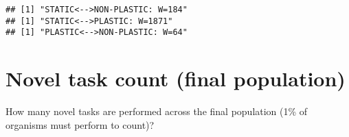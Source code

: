 \documentclass[]{book}
\newenvironment{Shaded}{\begin{snugshade}}{\end{snugshade}}
\newcommand{\ControlFlowTok}[1]{\textcolor[rgb]{0.13,0.29,0.53}{\textbf{#1}}}
\newcommand{\DataTypeTok}[1]{\textcolor[rgb]{0.13,0.29,0.53}{#1}}
\newcommand{\DecValTok}[1]{\textcolor[rgb]{0.00,0.00,0.81}{#1}}
\newcommand{\KeywordTok}[1]{\textcolor[rgb]{0.13,0.29,0.53}{\textbf{#1}}}
\newcommand{\NormalTok}[1]{#1}
\newcommand{\OperatorTok}[1]{\textcolor[rgb]{0.81,0.36,0.00}{\textbf{#1}}}
\newcommand{\OtherTok}[1]{\textcolor[rgb]{0.56,0.35,0.01}{#1}}
\newcommand{\StringTok}[1]{\textcolor[rgb]{0.31,0.60,0.02}{#1}}
\begin{document}
\begin{Shaded}
\end{Shaded}

\begin{verbatim}
## [1] "STATIC<-->NON-PLASTIC: W=184"
## [1] "STATIC<-->PLASTIC: W=1871"
## [1] "PLASTIC<-->NON-PLASTIC: W=64"
\end{verbatim}

\hypertarget{novel-task-count-final-population}{%
\section{Novel task count (final population)}\label{novel-task-count-final-population}}

How many novel tasks are performed across the final population (1\% of organisms must perform to count)?
\end{document}
